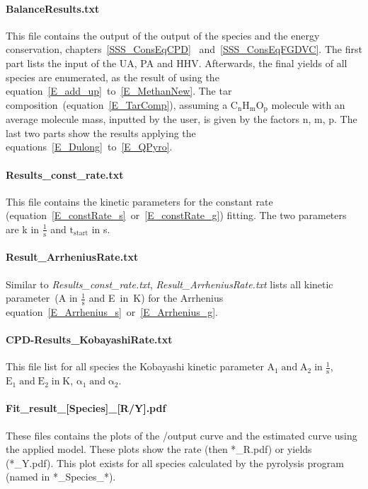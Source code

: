 \paragraph{BalanceResults.txt}
This file contains the output of the output of the species and the energy conservation, chapters~\ref{SSS_ConsEqCPD}
~and~\ref{SSS_ConsEqFGDVC}. The first part lists the input of the UA, PA and HHV. Afterwards, the final yields of all species are enumerated, as the result of using the equation~\ref{E_add_up}~to~\ref{E_MethanNew}. The tar composition~(equation~\ref{E_TarComp}), assuming a $\mathrm{C_nH_mO_p}$ molecule with an average molecule mass, inputted by the user, is given by the factors n, m, p. The last two parts show the results applying the equations~\ref{E_Dulong}~to~\ref{E_QPyro}.

\paragraph{Results\_const\_rate.txt}
This file contains the kinetic parameters for the constant rate (equation~\ref{E_constRate_s}~or~\ref{E_constRate_g}) fitting. The two parameters are k in $\mathrm{\frac{1}{s}}$ and $\mathrm{t_{start}}$ in s.

\paragraph{Result\_ArrheniusRate.txt}
Similar to \emph{Results\_const\_rate.txt}, \emph{Result\_ArrheniusRate.txt} lists all kinetic parameter~(A in $\mathrm{\frac{1}{s}}$ and E~in~K) for the Arrhenius equation~\ref{E_Arrhenius_s}~or~\ref{E_Arrhenius_g}.

\paragraph{CPD-Results\_KobayashiRate.txt}
This file list for all species the Kobayashi kinetic parameter $\mathrm{A_1 \; and \; A_2 \; in \; \frac{1}{s}}$, $\mathrm{E_1 \; and \; E_2 \; in \; K}$, $\mathrm{\alpha_1 \; and \; \alpha_2}$.

\paragraph{Fit\_result\_[Species]\_[R/Y].pdf}
These files contains the plots of the \CPD/\FGDVC output curve and the estimated curve using the applied model. These plots show the rate (then *\_R.pdf) or yields (*\_Y.pdf). This plot exists for all species calculated by the pyrolysis program (named in *\_Species\_*).

